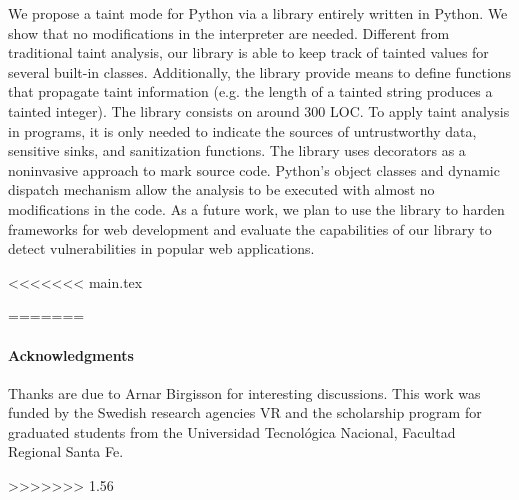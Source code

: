 \documentclass[oribibl]{llncs}
\begin{document}
We propose a taint mode for Python via a library entirely written
in Python.
We show that no modifications in the interpreter are needed. 
Different from traditional taint analysis, our library
is able to 
keep track of tainted values for  
several built-in classes.
Additionally, the library provide means to define functions that 
propagate taint information
(e.g. the length of a tainted string produces a
tainted integer). The library consists on around 300 LOC.
To apply taint analysis in programs, it is only needed 
to indicate the sources of untrustworthy data, sensitive 
sinks, and sanitization functions. The library uses decorators 
as a noninvasive approach to mark source code. 
Python's object classes 
and dynamic dispatch mechanism allow the analysis to be executed with almost no modifications
in the  code. %
As a future work, we plan to use the library to harden frameworks
for web development and evaluate the capabilities of our library to 
detect vulnerabilities
in popular web applications.


<<<<<<< main.tex

=======
{\small{
\paragraph{Acknowledgments}
Thanks are due to Arnar Birgisson for interesting discussions.
This work was funded by the Swedish research agencies VR and 
the scholarship program for graduated students 
from the Universidad Tecnol\'{o}gica Nacional, Facultad Regional Santa Fe. 
}}
>>>>>>> 1.56
{\small{


}}
\end{document}
